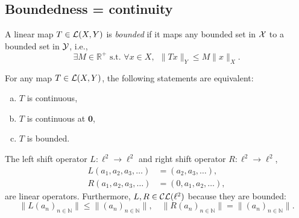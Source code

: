\subsection{Boundedness = continuity}

\begin{defn}
  \label{def:boundedLinearMap}
  A linear map $T\in {\cal L}(X,Y)$ is \emph{bounded} if
  it maps any bounded set in ${\cal X}$
  to a bounded set in ${\cal Y}$, i.e., 
  \begin{equation}
    \label{eq:boundedLinearMap}
    \exists M\in \mathbb{R}^+ \text{ s.t. }
    \forall x\in X,\ \  \|Tx\|_Y\le M \|x\|_X.
  \end{equation}
\end{defn}

\begin{thm}
  \label{thm:contLinearOpEquBoundedOp}
  For any map $T\in {\cal L}(X,Y)$, the following statements are equivalent:
  \begin{enumerate}[(a)]\itemsep0em
  \item $T$ is continuous,
  \item $T$ is continuous at $\mathbf{0}$,
  \item $T$ is bounded. 
  \end{enumerate}
\end{thm}

\begin{exm}
  \label{exm:leftAndRightShiftOnEll2}
  The left shift operator $L: \ell^2\rightarrow \ell^2$
  and right shift operator $R: \ell^2\rightarrow \ell^2$,
  \begin{align}
    \label{eq:leftShift}
    L(a_1, a_2, a_3, \ldots) &= (a_2, a_3, \ldots),
    \\
    \label{eq:rightShift}
    R(a_1, a_2, a_3, \ldots) &= (0, a_1, a_2,  \ldots),
  \end{align}
  are linear operators.
  Furthermore, $L, R\in {\cal CL}(\ell^2)$ because
  they are bounded:
  \begin{displaymath}
    \|L(a_n)_{n\in \mathbb{N}}\| \le \|(a_n)_{n\in \mathbb{N}}\|,
    \quad
    \|R(a_n)_{n\in \mathbb{N}}\| = \|(a_n)_{n\in \mathbb{N}}\|.
  \end{displaymath}
\end{exm}

